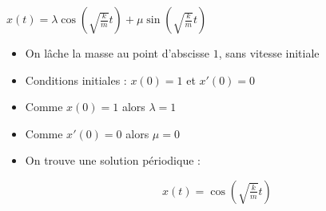 \begin{frame}
\begin{exemple}
\centerline{$x(t) = \lambda\cos \left(\sqrt{\tfrac{k}{m}}t\right)
+\mu\sin \left(\sqrt{\tfrac{k}{m}}t\right)$}

\smallskip

\begin{itemize}
  \pause
  \item On lâche la masse au point d'abscisse $1$, sans vitesse initiale
  \pause
  \item Conditions initiales : $x(0)=1$ et $x'(0)=0$
  \pause
  \item Comme $x(0)=1$ alors $\lambda=1$
  \pause
  \item Comme $x'(0) = 0$ alors $\mu = 0$
  \pause
  \item On trouve une solution périodique :
  
\vspace*{-2ex}  
$$x(t) = \cos \left(\sqrt{\tfrac{k}{m}}t\right)$$
\end{itemize}

\vspace*{-6ex}

 
 \vspace*{-5ex}
 
\end{exemple}

\end{frame}



